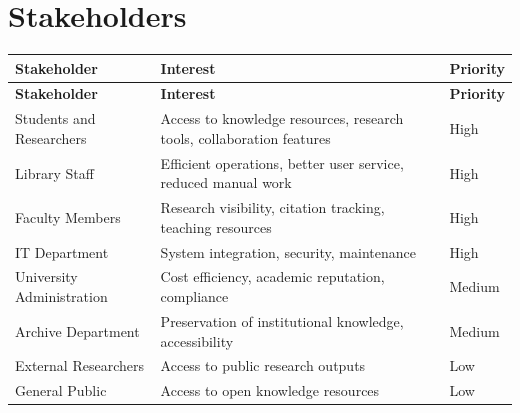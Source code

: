 \documentclass[12pt,a4paper]{report}
\begin{document}
\section{Stakeholders}
\begin{longtable}{|p{4cm}|p{6cm}|p{3cm}|}
\hline
\textbf{Stakeholder} & \textbf{Interest} & \textbf{Priority} \\ \hline
\endfirsthead
\hline
\textbf{Stakeholder} & \textbf{Interest} & \textbf{Priority} \\ \hline
\endhead
Students and Researchers & Access to knowledge resources, research tools, collaboration features & High \\ \hline
Library Staff & Efficient operations, better user service, reduced manual work & High \\ \hline
Faculty Members & Research visibility, citation tracking, teaching resources & High \\ \hline
IT Department & System integration, security, maintenance & High \\ \hline
University Administration & Cost efficiency, academic reputation, compliance & Medium \\ \hline
Archive Department & Preservation of institutional knowledge, accessibility & Medium \\ \hline
External Researchers & Access to public research outputs & Low \\ \hline
General Public & Access to open knowledge resources & Low \\ \hline
\end{longtable}
\end{document}
